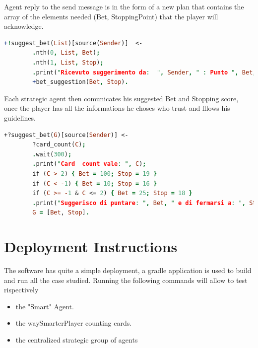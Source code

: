 Agent reply to the send message is in the form of a new plan that contains the array of the elements needed (Bet, StoppingPoint) that the player will acknowledge.

\begin{lstlisting}[language=Prolog]
    +!suggest_bet(List)[source(Sender)]  <- 
        .nth(0, List, Bet);
        .nth(1, List, Stop);
        .print("Ricevuto suggerimento da:  ", Sender, " : Punto ", Bet, " - Stop a ", Stop);
        +bet_suggestion(Bet, Stop). 
\end{lstlisting}


Each strategic agent then comunicates his suggested Bet and Stopping score, once the player has all the informations he choses who trust and fllows his guidelines. 

\begin{lstlisting}[language=Prolog]
    +?suggest_bet(G)[source(Sender)] <-  
        ?card_count(C);
        .wait(300);
        .print("Card  count vale: ", C);
        if (C > 2) { Bet = 100; Stop = 19 }  
        if (C < -1) { Bet = 10; Stop = 16 } 
        if (C >= -1 & C <= 2) { Bet = 25; Stop = 18 } 
        .print("Suggerisco di puntare: ", Bet, " e di fermarsi a: ", Stop);
        G = [Bet, Stop].
\end{lstlisting}


\chapter{Deployment Instructions}

The software has quite a simple deployment, a gradle application is used to build and run all the case studied. Running the following commands will allow to test rispectively
\begin{itemize}
    \item the "Smart" Agent.
    \item the waySmarterPlayer counting cards.
    \item the centralized strategic group of agents
\end{itemize}



